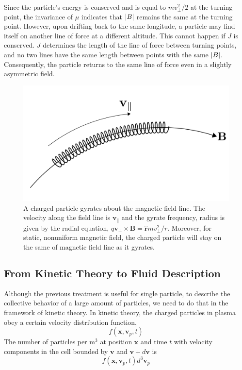 Since the particle's energy is conserved and is equal to $mv_\perp^2/2$ at the turning point, the invariance of $\mu$ indicates that $\abs{B}$ remains the same at the turning point. However, upon drifting back to the same longitude, a particle may find itself on another line of force at a different altitude. This cannot happen if $J$ is conserved. $J$ determines the length of the line of force between turning points, and no two lines have the same length between points with the same $\abs{B}$. Consequently, the particle returns to the same line of force even in a slightly asymmetric field.


\begin{figure}[htbp]
	\centering
	\includegraphics[width=0.7\linewidth]{figures/gyrate-along-b-field}
	\caption{A charged particle gyrates about the magnetic field line. The velocity along the field line is $\mathbf{v}_{\parallel}$ and the gyrate frequency, radius is given by the radial equation, $q\mathbf{v_{\perp}\times B} = \mathbf{\hat{r}} mv_\perp^2/r$. Moreover, for static, nonuniform magnetic field, the charged particle will stay on the same of magnetic field line as it gyrates.}
	\label{fig:gyrate-along-b-field}
\end{figure}

\subsection{From Kinetic Theory to Fluid Description}
Although the previous treatment is useful for single particle, to describe the collective behavior of a large amount of particles, we need to do that in the framework of kinetic theory. In kinetic theory, the charged particles in plasma obey a certain velocity distribution function,
\begin{equation}
	f(\mathbf{x}, \mathbf{v}_p, t)
\end{equation}
The number of particles per m$^3$ at position $\mathbf{x}$ and time $t$ with velocity components in the cell bounded by $\mathbf{v}$ and $\mathbf{v}+d\mathbf{v}$ is
\begin{equation}
	f(\mathbf{x}, \mathbf{v}_p, t)d^3\mathbf{v}_p
\end{equation}

